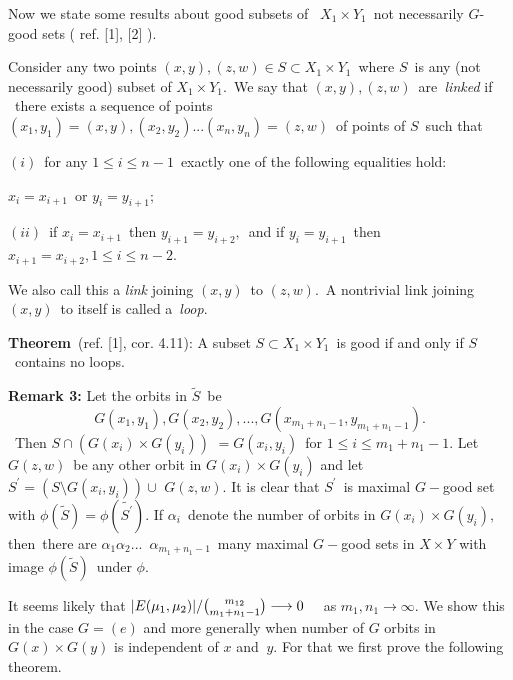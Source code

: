\documentclass{article}
\begin{document}
\bigskip

{\large Now we state some results about good subsets of \ $X_{1}\times Y_{1}
$\ not necessarily $G$-good sets ( ref. [1], [2] ). }

{\large Consider any two points $(x,y),(z,w)\in S\subset X_{1}\times Y_{1}$\
where $S$\ is any (not necessarily good) subset of $X_{1}\times Y_{1}.$\ We
say that $(x,y),(z,w)$\ are\emph{\ linked} if \ there exists a sequence of
points $(x_{1},y_{1})=(x,y),(x_{2},y_{2})...(x_{n},y_{n})=(z,w)$\ of points
of $S$\ such that }

{\large $(i)$\ for any $1\leq i\leq n-1$\ exactly one of the following
equalities hold: }

{\large $x_{i}=x_{i+1}$\ or $y_{i}=y_{i+1};$ }

{\large $(ii)$\ if $x_{i}=x_{i+1}$\ then $y_{i+1}=y_{i+2},$\ and if $%
y_{i}=y_{i+1}$\ then $x_{i+1}=x_{i+2},1\leq i\leq n-2.$ }

{\large We also call this a \emph{link} joining $(x,y)$\ to $(z,w). $\ A
nontrivial link joining $(x,y)$\ to itself is called a\ \emph{loop}. }

{\large \bigskip }

{\large \textbf{Theorem}\ (ref. [1], cor. 4.11): A subset $S\subset
X_{1}\times Y_{1}$\ is good if and only if $S$\ contains no loops. }

{\large \bigskip }

{\large \bigskip }

{\large \textbf{Remark 3:} Let the orbits in $\widetilde{S}$\ be
\begin{equation*}
G(x_{1},y_{1}),G(x_{2},y_{2}),...,G(x_{m_{1}+n_{1}-1},y_{m_{1}+n_{1}-1}).
\end{equation*}
\ Then $S\cap (G(x_{i})\times G(y_{i}))$ $=G(x_{i},y_{i})$\ for $1\leq i\leq
m_{1}+n_{1}-1.$ Let $G(z,w)$\ be any other orbit in $G(x_{i})\times G(y_{i})$
and let $S^{\prime }=(S\setminus G(x_{i},y_{i}))\cup $ $G(z,w).$ It is clear
that $S^{\prime }$\ is maximal $G-$good set with $\phi (\widetilde{S})=\phi (%
\widetilde{S^{\prime }})$. If $\alpha _{i}$\ denote the number of orbits in $%
G(x_{i})\times G(y_{i}),$ then\ there are $\alpha _{1}\alpha _{2}...$\ $%
\alpha _{m_{1}+n_{1}-1}$\ many maximal $G-$good sets in $X\times Y$ with
image $\phi (\widetilde{S})$\ under $\phi .$ }

{\large It seems likely that $|E(\mu _{1},\mu _{2})|/\binom{m_{12}}{%
m_{1}+n_{1}-1}\longrightarrow 0$ \ \ as $m_{1},n_{1}\longrightarrow \infty .$
We show this in the case $G=(e)$ and more generally when number of $G$
orbits in $G(x)\times G(y)$ is independent of $x$ and $\ y.$ For that we
first prove the following theorem. }
\end{document}
